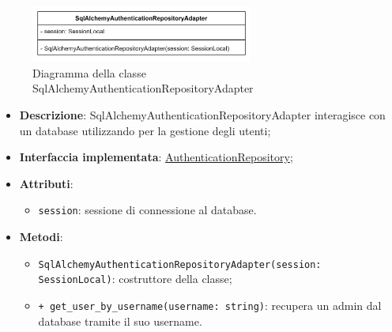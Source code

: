  \label{SqlAlchemyAuthenticationRepositoryAdapter}
\begin{figure}[H]
    \centering
    \includegraphics[width=0.65\textwidth]{assets/Backend/sql_alchemy_authentication_repository_adapter.png}
    \caption{Diagramma della classe SqlAlchemyAuthenticationRepositoryAdapter}
  \end{figure}
\begin{itemize}
    \item \textbf{Descrizione}: SqlAlchemyAuthenticationRepositoryAdapter interagisce con un database utilizzando  per la gestione degli utenti;
    \item \textbf{Interfaccia implementata}: \hyperref[AuthenticationRepository]{AuthenticationRepository};
    \item \textbf{Attributi}:
    \begin{itemize}
        \item \texttt{session}: sessione di connessione al database.
    \end{itemize}
    \item \textbf{Metodi}:
    \begin{itemize}
        \item \texttt{SqlAlchemyAuthenticationRepositoryAdapter(session: SessionLocal)}: costruttore della classe;
        \item \texttt{+ get\_user\_by\_username(username: string)}: recupera un admin dal database tramite il suo username.
    \end{itemize}
\end{itemize} 

